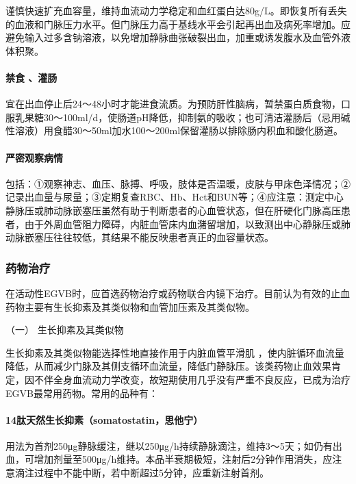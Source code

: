 谨慎快速扩充血容量，维持血流动力学稳定和血红蛋白达80g/L。即恢复所有丢失的血液和门脉压力水平。但门脉压力高于基线水平会引起再出血及病死率增加。应避免输入过多含钠溶液，以免增加静脉曲张破裂出血，加重或诱发腹水及血管外液体积聚。

\paragraph{禁食 、灌肠}

宜在出血停止后24～48小时才能进食流质。为预防肝性脑病，暂禁蛋白质食物，口服乳果糖30～100ml/d，使肠道pH降低，抑制氨的吸收；也可清洁灌肠后（忌用碱性溶液）用食醋30～50ml加水100～200ml保留灌肠以排除肠内积血和酸化肠道。

\paragraph{严密观察病情}

包括：①观察神志、血压、脉搏、呼吸，肢体是否温暖，皮肤与甲床色泽情况；②记录出血量与尿量；③定期复查RBC、Hb、Hct和BUN等；④应注意：测定中心静脉压或肺动脉嵌塞压虽然有助于判断患者的心血管状态，但在肝硬化门脉高压患者，由于外周血管阻力障碍，内脏血管床内血潴留增加，以致测出中心静脉压或肺动脉嵌塞压往往较低，其结果不能反映患者真正的血容量状态。

\subsubsection{药物治疗}

在活动性EGVB时，应首选药物治疗或药物联合内镜下治疗。目前认为有效的止血药物主要有生长抑素及其类似物和血管加压素及其类似物。

\hypertarget{text00328.htmlux5cux23CHP11-7-1-3-2-1}{}
（一） 生长抑素及其类似物

生长抑素及其类似物能选择性地直接作用于内脏血管平滑肌
，使内脏循环血流量降低，从而减少门脉及其侧支循环血流量，降低门静脉压。该类药物止血效果肯定，因不伴全身血流动力学改变，故短期使用几乎没有严重不良反应，已成为治疗EGVB最常用药物。常用的品种有：

\paragraph{14肽天然生长抑素（somatostatin，思他宁）}

用法为首剂250μg静脉缓注，继以250μg/h持续静脉滴注，维持3～5天；如仍有出血，可增加剂量至500μg/h维持。本品半衰期极短，注射后2分钟作用消失，应注意滴注过程中不能中断，若中断超过5分钟，应重新注射首剂。

